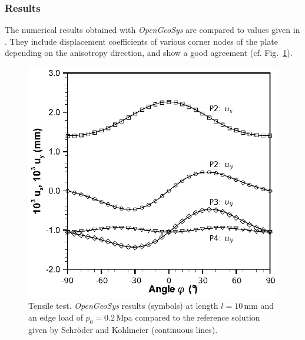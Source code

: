 \clearpage

\subsubsection{Results}
\label{subsubsec:Me7_res}

The numerical results obtained with {\sl OpenGeoSys} are compared to values given in \cite{Kohlmeier:2006}. They include displacement coefficients of various corner nodes of the plate depending on the anisotropy direction, and show a good agreement (cf. Fig.~\ref{Me_tens_transiso_test_2d}). 
%
\begin{figure}[!htb]
\begin{center}
\includegraphics[scale=0.7]{PART_II/M/tenstest_results_OGS.eps}
\end{center}
\caption{Tensile test. {\sl OpenGeoSys} results (symbols) at length $l=10\,$mm and an edge load of $p_0=0.2\,$Mpa compared to the reference solution given by Schr\"oder \cite{Schroeder:1996} and Kohlmeier \cite{Kohlmeier:2006} (continuous lines).}
\label{Me_tens_transiso_test_2d}
\end{figure}

\clearpage